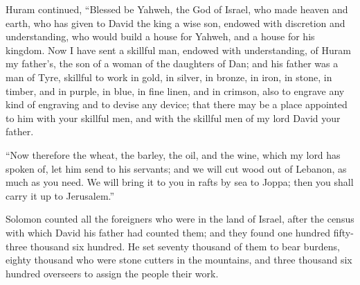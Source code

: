 {Huram continued, “Blessed be Yahweh, the God of Israel, who made heaven and earth, who has given to David the king a wise son, endowed with discretion and understanding, who would build a house for Yahweh, and a house for his kingdom.
Now I have sent a skillful man, endowed with understanding, of Huram my father’s,
the son of a woman of the daughters of Dan; and his father was a man of Tyre, skillful to work in gold, in silver, in bronze, in iron, in stone, in timber, and in purple, in blue, in fine linen, and in crimson, also to engrave any kind of engraving and to devise any device; that there may be a place appointed to him with your skillful men, and with the skillful men of my lord David your father.
\par }{\PP {}“Now therefore the wheat, the barley, the oil, and the wine, which my lord has spoken of, let him send to his servants;
and we will cut wood out of Lebanon, as much as you need. We will bring it to you in rafts by sea to Joppa; then you shall carry it up to Jerusalem.”
\par }{\PP {}Solomon counted all the foreigners who were in the land of Israel, after the census with which David his father had counted them; and they found one hundred fifty-three thousand six hundred.
He set seventy thousand of them to bear burdens, eighty thousand who were stone cutters in the mountains, and three thousand six hundred overseers to assign the people their work.

}
